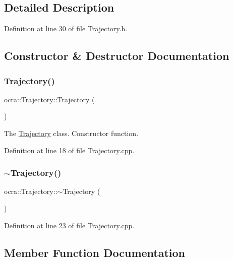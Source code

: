 \subsection{Detailed Description}


Definition at line 30 of file Trajectory.\+h.



\subsection{Constructor \& Destructor Documentation}
\hypertarget{classocra_1_1Trajectory_a0188adbc4ad9608302303dc4615ebecb}{}\label{classocra_1_1Trajectory_a0188adbc4ad9608302303dc4615ebecb} 
\subsubsection{\texorpdfstring{Trajectory()}{Trajectory()}}
{\footnotesize\ttfamily ocra\+::\+Trajectory\+::\+Trajectory (\begin{DoxyParamCaption}{ }\end{DoxyParamCaption})}

The \hyperlink{classocra_1_1Trajectory}{Trajectory} class. Constructor function. 

Definition at line 18 of file Trajectory.\+cpp.

\hypertarget{classocra_1_1Trajectory_aede5bc277bdb4aff286b68c1d7a5d9be}{}\label{classocra_1_1Trajectory_aede5bc277bdb4aff286b68c1d7a5d9be} 
\subsubsection{\texorpdfstring{$\sim$\+Trajectory()}{~Trajectory()}}
{\footnotesize\ttfamily ocra\+::\+Trajectory\+::$\sim$\+Trajectory (\begin{DoxyParamCaption}{ }\end{DoxyParamCaption})\hspace{0.3cm}{\ttfamily [virtual]}}



Definition at line 23 of file Trajectory.\+cpp.



\subsection{Member Function Documentation}
\hypertarget{classocra_1_1Trajectory_ae430040a9159317971ce66f4bd3a162a}{}\label{classocra_1_1Trajectory_ae430040a9159317971ce66f4bd3a162a} 
